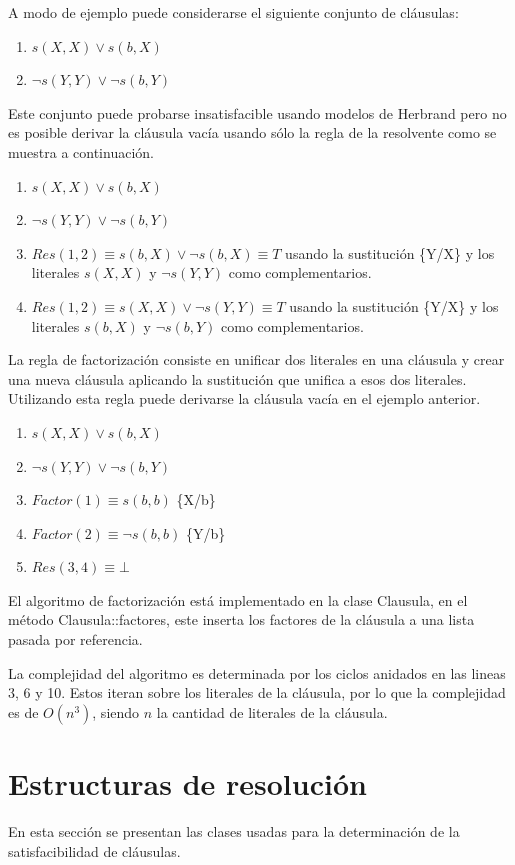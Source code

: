 \documentclass[a4paper,12pt]{article}
\begin{document}
A modo de ejemplo puede considerarse el siguiente conjunto de cláusulas:
\begin{enumerate}
\item $s(X,X)\lor s(b,X)$
\item $\lnot s(Y,Y)\lor \lnot s(b,Y)$
\end{enumerate}
Este conjunto puede probarse insatisfacible usando modelos de Herbrand pero no es posible
derivar la cláusula vacía usando sólo la regla de la resolvente como se muestra a continuación.
\begin{enumerate}
\item $s(X,X)\lor s(b,X)$
\item $\lnot s(Y,Y)\lor \lnot s(b,Y)$
\item $Res(1,2) \equiv s(b,X) \lor \lnot s(b,X) \equiv T$ usando la sustitución \{Y/X\} y los
literales $s(X,X)$ y $\lnot s(Y,Y)$ como complementarios.
\item $Res(1,2) \equiv s(X,X) \lor \lnot s(Y,Y) \equiv T$ usando la sustitución \{Y/X\} y los
literales $s(b,X)$ y $\lnot s(b,Y)$ como complementarios.
\end{enumerate}
La regla de factorización consiste en unificar dos literales en una cláusula y crear una nueva
cláusula aplicando la sustitución que unifica a esos dos literales. Utilizando esta regla puede
derivarse la cláusula vacía en el ejemplo anterior.
\begin{enumerate}
\item $s(X,X)\lor s(b,X)$
\item $\lnot s(Y,Y)\lor \lnot s(b,Y)$
\item $Factor(1) \equiv s(b,b)$ \{X/b\}
\item $Factor(2) \equiv \lnot s(b,b)$ \{Y/b\}
\item $Res(3,4) \equiv \bot$
\end{enumerate}
El algoritmo de factorización está implementado en la clase Clausula, en el método
Clausula::factores, este inserta los factores de la cláusula a una lista pasada
por referencia.

La complejidad del algoritmo es determinada por los ciclos anidados en las lineas 3, 6 y 10. Estos iteran
sobre los literales de la cláusula, por lo que la complejidad es de $O(n^3)$, siendo $n$ la cantidad de
literales de la cláusula.%
\section{Estructuras de resolución}
En esta sección se presentan las clases usadas para la determinación de la satisfacibilidad
de cláusulas.
\end{document}
